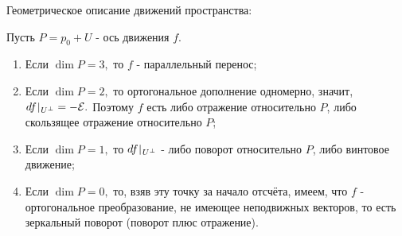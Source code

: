 \documentclass[a4paper]{article}%
\renewcommand{\ab}{\par\noindent}%
\renewcommand{\om}[1]{\mathcal{#1}}
\begin{document}
\ab Геометрическое описание движений пространства:
\ab Пусть $P=p_0+U$ - ось движения $f$.
\begin{enumerate}
    \item Если $\dim P=3,$ то $f$ - параллельный перенос;
    \item Если $\dim P=2,$ то ортогональное дополнение одномерно, значит, $df\,\vrule\,_{U^\bot}=\om{-E}.$ Поэтому
    $f$ есть либо отражение относительно $P$, либо скользящее отражение относительно $P$;
    \item Если $\dim P=1,$ то $df\,\vrule\,_{U^\bot}$ - либо поворот относительно $P$, либо винтовое движение;
    \item Если $\dim P=0,$ то, взяв эту точку за начало отсчёта, имеем, что $f$ - ортогональное преобразование,
    не имеющее неподвижных векторов, то есть зеркальный поворот (поворот плюс отражение).
\end{enumerate}
\end{document}
